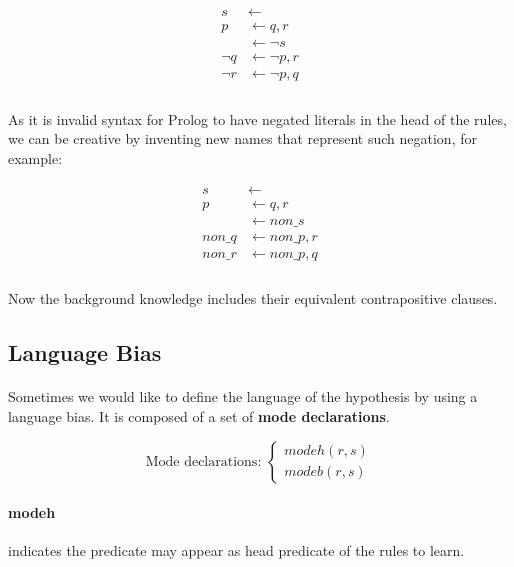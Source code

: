 \documentclass{article}
\theoremstyle{plain}
\theoremstyle{definition}
\begin{document}
\begin{multicols}{2}
\begin{align*}
s &\leftarrow\\
p &\leftarrow q, r\\
&\leftarrow \lnot s\\
\lnot q &\leftarrow \lnot p, r\\
\lnot r &\leftarrow \lnot p, q\\
\end{align*}

\paragraph{} As it is invalid syntax for Prolog to have negated literals in the head of the rules, we can be creative by inventing new names that represent such negation, for example:

\begin{align*}
s &\leftarrow\\
p &\leftarrow q, r\\
&\leftarrow non\_s\\
non\_q &\leftarrow non\_p, r\\
non\_r &\leftarrow non\_p, q\\
\end{align*}

\paragraph{} Now the background knowledge includes their equivalent contrapositive clauses.

\subsection{Language Bias}

\paragraph{} Sometimes we would like to define the language of the hypothesis by using a language bias. It is composed of a set of \textbf{mode declarations}.

\[
\text{Mode declarations: }
\begin{cases}
	modeh(r, s)\\
	modeb(r, s)
\end{cases}
\]

\paragraph{modeh} indicates the predicate may appear as head predicate of the rules to learn.

\end{multicols}
\end{document}

